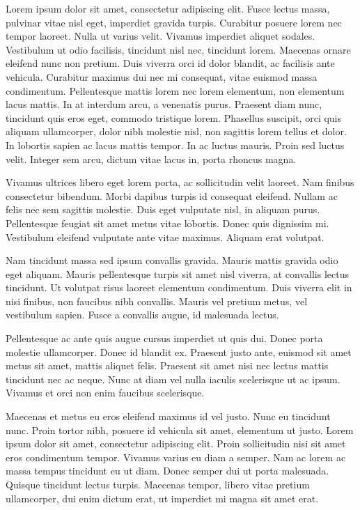  Lorem ipsum dolor sit amet, consectetur adipiscing elit. Fusce lectus massa, pulvinar vitae nisl eget, imperdiet gravida turpis. Curabitur posuere lorem nec tempor laoreet. Nulla ut varius velit. Vivamus imperdiet aliquet sodales. Vestibulum ut odio facilisis, tincidunt nisl nec, tincidunt lorem. Maecenas ornare eleifend nunc non pretium. Duis viverra orci id dolor blandit, ac facilisis ante vehicula. Curabitur maximus dui nec mi consequat, vitae euismod massa condimentum. Pellentesque mattis lorem nec lorem elementum, non elementum lacus mattis. In at interdum arcu, a venenatis purus. Praesent diam nunc, tincidunt quis eros eget, commodo tristique lorem. Phasellus suscipit, orci quis aliquam ullamcorper, dolor nibh molestie nisl, non sagittis lorem tellus et dolor. In lobortis sapien ac lacus mattis tempor. In ac luctus mauris. Proin sed luctus velit. Integer sem arcu, dictum vitae lacus in, porta rhoncus magna.

Vivamus ultrices libero eget lorem porta, ac sollicitudin velit laoreet. Nam finibus consectetur bibendum. Morbi dapibus turpis id consequat eleifend. Nullam ac felis nec sem sagittis molestie. Duis eget vulputate nisl, in aliquam purus. Pellentesque feugiat sit amet metus vitae lobortis. Donec quis dignissim mi. Vestibulum eleifend vulputate ante vitae maximus. Aliquam erat volutpat.

Nam tincidunt massa sed ipsum convallis gravida. Mauris mattis gravida odio eget aliquam. Mauris pellentesque turpis sit amet nisl viverra, at convallis lectus tincidunt. Ut volutpat risus laoreet elementum condimentum. Duis viverra elit in nisi finibus, non faucibus nibh convallis. Mauris vel pretium metus, vel vestibulum sapien. Fusce a convallis augue, id malesuada lectus.

Pellentesque ac ante quis augue cursus imperdiet ut quis dui. Donec porta molestie ullamcorper. Donec id blandit ex. Praesent justo ante, euismod sit amet metus sit amet, mattis aliquet felis. Praesent sit amet nisi nec lectus mattis tincidunt nec ac neque. Nunc at diam vel nulla iaculis scelerisque ut ac ipsum. Vivamus et orci non enim faucibus scelerisque.

Maecenas et metus eu eros eleifend maximus id vel justo. Nunc eu tincidunt nunc. Proin tortor nibh, posuere id vehicula sit amet, elementum ut justo. Lorem ipsum dolor sit amet, consectetur adipiscing elit. Proin sollicitudin nisi sit amet eros condimentum tempor. Vivamus varius eu diam a semper. Nam ac lorem ac massa tempus tincidunt eu ut diam. Donec semper dui ut porta malesuada. Quisque tincidunt lectus turpis. Maecenas tempor, libero vitae pretium ullamcorper, dui enim dictum erat, ut imperdiet mi magna sit amet erat.

